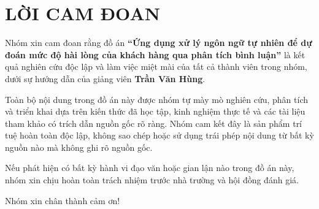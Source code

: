 
\newpage

\section{\textbf{LỜI CAM ĐOAN}}

Nhóm xin cam đoan rằng đồ án \textbf{“Ứng dụng xử lý ngôn ngữ tự nhiên để dự đoán mức độ hài lòng của khách hàng qua phân tích bình luận”} là kết quả nghiên cứu độc lập và làm việc miệt mài của tất cả thành viên trong nhóm, dưới sự hướng dẫn của giảng viên \textbf{Trần Văn Hùng}.

Toàn bộ nội dung trong đồ án này được nhóm tự mày mò nghiên cứu, phân tích và triển khai dựa trên kiến thức đã học tập, kinh nghiệm thực tế và các tài liệu tham khảo có trích dẫn nguồn gốc rõ ràng. Nhóm cam kết đây là sản phẩm trí tuệ hoàn toàn độc lập, không sao chép hoặc sử dụng trái phép nội dung từ bất kỳ nguồn nào mà không ghi rõ nguồn gốc.

Nếu phát hiện có bất kỳ hành vi đạo văn hoặc gian lận nào trong đồ án này, nhóm xin chịu hoàn toàn trách nhiệm trước nhà trường và hội đồng đánh giá.

Nhóm xin chân thành cảm ơn!

 